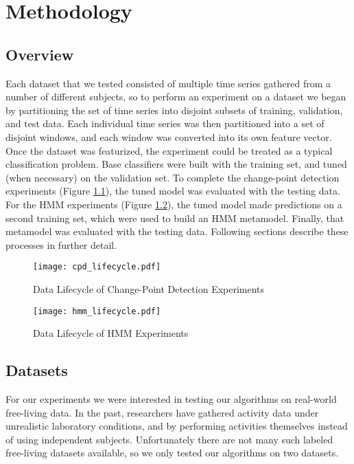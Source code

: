 \chapter{Methodology}
\section{Overview}
Each dataset that we tested consisted of multiple time series gathered from
a number of different subjects, so to perform an experiment on a dataset we began by
partitioning the set of time series into disjoint subsets of training, validation,
and test data. Each individual time series was then partitioned into
a set of disjoint windows, and each window was converted into its own feature vector. Once the dataset was
featurized, the experiment could be treated as a typical classification problem.
Base classifiers were built with the training set, and tuned (when necessary)
on the validation set. 
To complete the change-point detection experiments (Figure \ref{fig:cpd_lifecycle}),
the tuned model was evaluated with the testing data. For the HMM experiments
(Figure \ref{fig:hmm_lifecycle}), the tuned model made predictions on a
second training set, which were used to build an HMM metamodel. Finally, that
metamodel was evaluated with the testing data. Following sections describe these
processes in further detail.

\begin{figure}
 \centering
 \texttt{[image: cpd\_lifecycle.pdf]}
 \caption{Data Lifecycle of Change-Point Detection Experiments}
 \label{fig:cpd_lifecycle}
\end{figure}

\begin{figure}
 \centering
 \texttt{[image: hmm\_lifecycle.pdf]}
 \caption{Data Lifecycle of HMM Experiments}
 \label{fig:hmm_lifecycle}
\end{figure}

\section{Datasets}
For our experiments we were interested in testing our algorithms on real-world free-living
data. In the past, researchers have gathered activity data under unrealistic
laboratory conditions, and by performing activities themselves instead of using
independent subjects.
Unfortunately there are not many such labeled free-living datasets available,
so we only tested our algorithms on two datasets.

